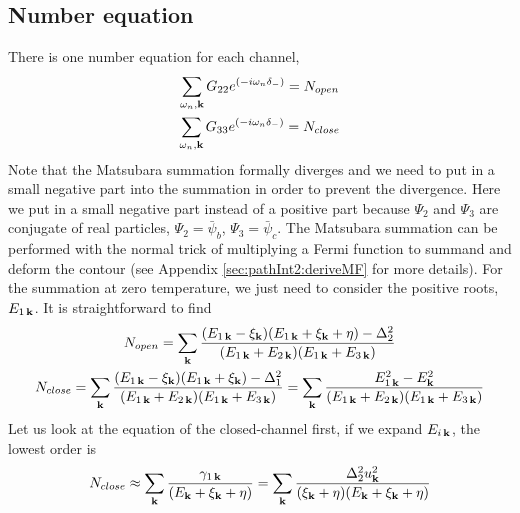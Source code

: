 \subsection{Number equation}
There is one  number equation for each channel,  
\begin{gather*}
\sum_{\omega_{n}, \mathbf{k}}G_{22}e^{(-i\omega_n\delta_-)}=N_{open}\\
\sum_{\omega_{n},\mathbf{k}}G_{33}e^{(-i\omega_n\delta_-)}=N_{close}
\end{gather*}
Note that the Matsubara summation  formally diverges and we need to put in a small negative part into the summation in order to prevent the divergence.  Here we put in a small  negative part instead of a positive part  because $\Psi_{2}$ and $\Psi_{3}$ are conjugate of real particles, $\Psi_2=\bar\psi_b$, $\Psi_3=\bar\psi_c$.  The Matsubara summation can be performed with the normal trick of multiplying a Fermi function to summand and deform the contour  (see Appendix \ref{sec:pathInt2:deriveMF} for more details).  For the summation at zero temperature, we just need to consider the positive roots, $E_{1\,\mathbf{k}}$.  It is straightforward to find 
\begin{gather}
N_{open}=\sum_{\mathbf{k}}\frac{(E_{1\,\mathbf{k}}-\xi_{\mathbf{k}})(E_{1\,\mathbf{k}}+\xi_{\mathbf{k}}+\eta)-\Delta_2^2}{(E_{1\,\mathbf{k}}+E_{2\,\mathbf{k}})(E_{1\,\mathbf{k}}+E_{3\,\mathbf{k}})}
\label{eq:pathInt2:numOpen}\\
N_{close}=\sum_{\mathbf{k}}\frac{(E_{1\,\mathbf{k}}-\xi_{\mathbf{k}})(E_{1\,\mathbf{k}}+\xi_{\mathbf{k}})-\Delta_1^2}{(E_{1\,\mathbf{k}}+E_{2\,\mathbf{k}})(E_{1\,\mathbf{k}}+E_{3\,\mathbf{k}})}
=\sum_{\mathbf{k}}\frac{E_{1\,\mathbf{k}}^2-E_{\mathbf{k}}^2}{(E_{1\,\mathbf{k}}+E_{2\,\mathbf{k}})(E_{1\,\mathbf{k}}+E_{3\,\mathbf{k}})}\label{eq:pathInt2:numClose}
\end{gather}
Let us look at the equation of the closed-channel first, if we expand $E_{i\,\mathbf{k}}$, the lowest order is 
\begin{equation}
N_{close}\approx\sum_{\mathbf{k}}\frac{\gamma_{1\,\mathbf{k}}}{(E_{\mathbf{k}}+\xi_{\mathbf{k}}+\eta)}=\sum_{\mathbf{k}}\frac{\Delta_{2}^2u_{\mathbf{k}}^{2}}{(\xi_{\mathbf{k}}+\eta)(E_{\mathbf{k}}+\xi_{\mathbf{k}}+\eta)}
\end{equation}
